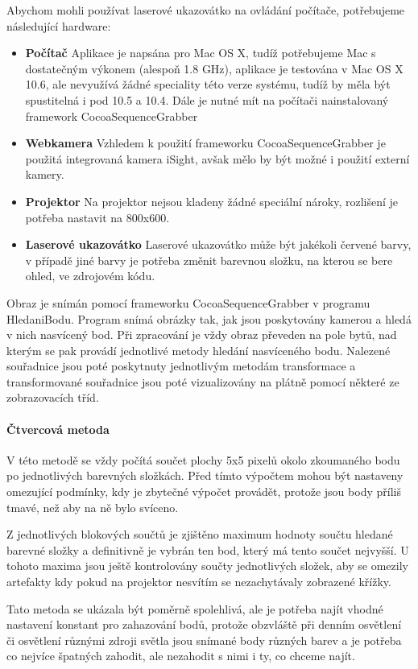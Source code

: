 \documentclass[twoside,12pt]{article}
\newcommand{\podpodsekce}[1]{\paragraph{#1}\quad\vskip 6pt}
\begin{document}
Abychom mohli používat laserové ukazovátko na ovládání počítače, potřebujeme následující hardware:
\begin{itemize}
 \item{\bf Počítač} Aplikace je napsána pro Mac OS X, tudíž potřebujeme Mac s dostatečným výkonem (alespoň 1.8 GHz), aplikace je testována v Mac OS X 10.6, ale nevyužívá žádné speciality této verze systému, tudíž by měla být spustitelná i pod 10.5 a 10.4. Dále je nutné mít na počítači nainstalovaný framework CocoaSequenceGrabber
 \item{\bf Webkamera} Vzhledem k použití frameworku CocoaSequenceGrabber je použitá integrovaná kamera iSight, avšak mělo by být možné i použití externí kamery. 
\item{\bf Projektor} Na projektor nejsou kladeny žádné speciální nároky, rozlišení je potřeba nastavit na 800x600.
\item{\bf Laserové ukazovátko} Laserové ukazovátko může být jakékoli červené barvy, v případě jiné barvy je potřeba změnit barevnou složku, na kterou se bere ohled, ve zdrojovém kódu.
\end{itemize}

Obraz je snímán pomocí frameworku CocoaSequenceGrabber v programu HledaniBodu. Program snímá obrázky tak, jak jsou poskytovány kamerou a hledá v nich nasvícený bod. Při zpracování je vždy obraz převeden na pole bytů, nad kterým se pak provádí jednotlivé metody hledání nasvíceného bodu. Nalezené souřadnice jsou poté poskytnuty jednotlivým metodám transformace a transformované souřadnice jsou poté vizualizovány na plátně pomocí některé ze zobrazovacích tříd.

\podpodsekce{Čtvercová metoda}

V této metodě se vždy počítá součet plochy 5x5 pixelů okolo zkoumaného bodu po jednotlivých barevných složkách. Před tímto výpočtem mohou být nastaveny omezující podmínky, kdy je zbytečné výpočet provádět, protože jsou body příliš tmavé, než aby na ně bylo svíceno. 

Z jednotlivých blokových součtů je zjištěno maximum hodnoty součtu hledané barevné složky a definitivně je vybrán ten bod, který má tento součet nejvyšší. U tohoto maxima jsou ještě kontrolovány součty jednotlivých složek, aby se omezily artefakty kdy pokud na projektor nesvítím se nezachytávaly zobrazené křížky.

Tato metoda se ukázala být poměrně spolehlivá, ale je potřeba najít vhodné nastavení konstant pro zahazování bodů, protože obzvláště při denním osvětlení či osvětlení různými zdroji světla  jsou snímané body různých barev a je potřeba co nejvíce špatných zahodit, ale nezahodit s nimi i ty, co chceme najít.
\end{document}
